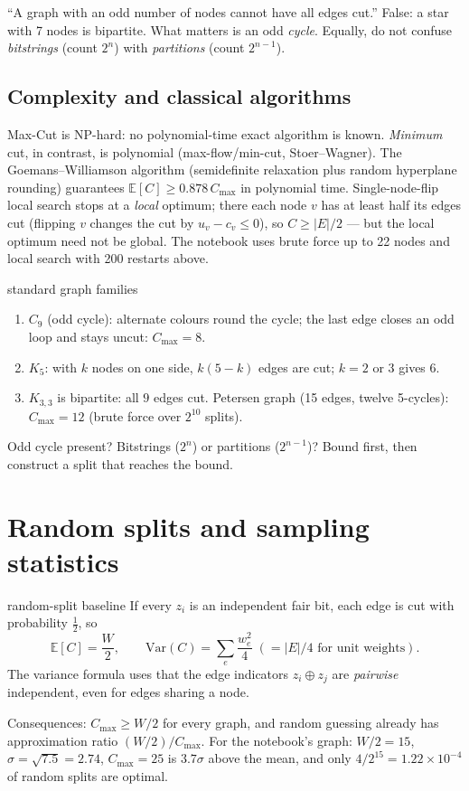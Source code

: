 \documentclass[11pt,a4paper,openany]{book}
\newcounter{wex}[chapter]
\newenvironment{steps}{\begin{enumerate}[label=\textbf{Step \arabic*.}, leftmargin=4.2em, itemsep=2pt]}{\end{enumerate}}
\begin{document}
\begin{trap}
``A graph with an odd number of nodes cannot have all edges cut.'' False: a star with 7 nodes is bipartite. What matters is an
odd \emph{cycle}. Equally, do not confuse \emph{bitstrings} (count $2^n$) with \emph{partitions} (count $2^{n-1}$).
\end{trap}

\subsection{Complexity and classical algorithms}
Max-Cut is NP-hard: no polynomial-time exact algorithm is known. \emph{Minimum} cut, in contrast, is polynomial (max-flow/min-cut,
Stoer--Wagner). The Goemans--Williamson algorithm (semidefinite relaxation plus random hyperplane rounding) guarantees
$\mathbb E[C] \ge 0.878\,C_{\max}$ in polynomial time. Single-node-flip local search stops at a \emph{local} optimum; there each node $v$
has at least half its edges cut (flipping $v$ changes the cut by $u_v - c_v \le 0$), so $C \ge |E|/2$ --- but the local optimum need
not be global. The notebook uses brute force up to 22 nodes and local search with 200 restarts above.

\begin{wexample}{standard graph families}
\begin{steps}
\item $C_9$ (odd cycle): alternate colours round the cycle; the last edge closes an odd loop and stays uncut: $C_{\max} = 8$.
\item $K_5$: with $k$ nodes on one side, $k(5 - k)$ edges are cut; $k = 2$ or $3$ gives $6$.
\item $K_{3,3}$ is bipartite: all $9$ edges cut. Petersen graph (15 edges, twelve 5-cycles): $C_{\max} = 12$ (brute force over $2^{10}$ splits).
\end{steps}
\end{wexample}
\begin{checklist}
Odd cycle present? Bitstrings ($2^n$) or partitions ($2^{n-1}$)? Bound first, then construct a split that reaches the bound.
\end{checklist}

\section{Random splits and sampling statistics}
\begin{keyres}{random-split baseline}
If every $z_i$ is an independent fair bit, each edge is cut with probability $\frac12$, so
\[ \mathbb E[C] = \frac W2, \qquad \mathrm{Var}(C) = \sum_{e}\frac{w_e^2}{4} \;(= |E|/4 \text{ for unit weights}). \]
The variance formula uses that the edge indicators $z_i\oplus z_j$ are \emph{pairwise} independent, even for edges sharing a node.
\end{keyres}
Consequences: $C_{\max} \ge W/2$ for every graph, and random guessing already has approximation ratio $(W/2)/C_{\max}$.
For the notebook's graph: $W/2 = 15$, $\sigma = \sqrt{7.5} = 2.74$, $C_{\max} = 25$ is $3.7\sigma$ above the mean, and only
$4/2^{15} = 1.22\times10^{-4}$ of random splits are optimal.
\end{document}
